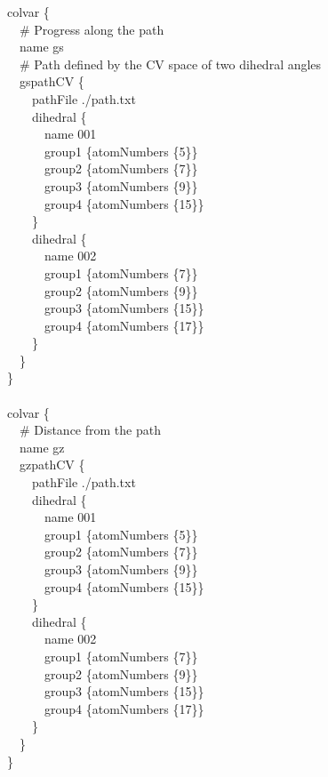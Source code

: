 \begin{cvexampleinput}
\-colvar \{\\
\-~~\# Progress along the path\\
\-~~name gs\\
\-~~\# Path defined by the CV space of two dihedral angles\\
\-~~gspathCV \{\\
\-~~~~pathFile ./path.txt\\
\-~~~~dihedral \{\\
\-~~~~~~name 001\\
\-~~~~~~group1 \{atomNumbers \{5\}\}\\
\-~~~~~~group2 \{atomNumbers \{7\}\}\\
\-~~~~~~group3 \{atomNumbers \{9\}\}\\
\-~~~~~~group4 \{atomNumbers \{15\}\}\\
\-~~~~\}\\
\-~~~~dihedral \{\\
\-~~~~~~name 002\\
\-~~~~~~group1 \{atomNumbers \{7\}\}\\
\-~~~~~~group2 \{atomNumbers \{9\}\}\\
\-~~~~~~group3 \{atomNumbers \{15\}\}\\
\-~~~~~~group4 \{atomNumbers \{17\}\}\\
\-~~~~\}\\
\-~~\}\\
\}\\
\\
\-colvar \{\\
\-~~\# Distance from the path\\
\-~~name gz\\
\-~~gzpathCV \{\\
\-~~~~pathFile ./path.txt\\
\-~~~~dihedral \{\\
\-~~~~~~name 001\\
\-~~~~~~group1 \{atomNumbers \{5\}\}\\
\-~~~~~~group2 \{atomNumbers \{7\}\}\\
\-~~~~~~group3 \{atomNumbers \{9\}\}\\
\-~~~~~~group4 \{atomNumbers \{15\}\}\\
\-~~~~\}\\
\-~~~~dihedral \{\\
\-~~~~~~name 002\\
\-~~~~~~group1 \{atomNumbers \{7\}\}\\
\-~~~~~~group2 \{atomNumbers \{9\}\}\\
\-~~~~~~group3 \{atomNumbers \{15\}\}\\
\-~~~~~~group4 \{atomNumbers \{17\}\}\\
\-~~~~\}\\
\-~~\}\\
\}
\end{cvexampleinput}


